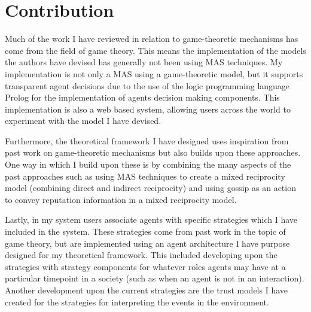 \documentclass[]{final_report}
\begin{document}
\section{Contribution}
Much of the work I have reviewed in relation to game-theoretic mechanisms has come from the field of game theory. This means the implementation of the models the authors have devised has generally not been using MAS techniques. My implementation is not only a MAS using a game-theoretic model, but it supports transparent agent decisions due to the use of the logic programming language Prolog for the implementation of agents decision making components. This implementation is also a web based system, allowing users across the world to experiment with the model I have devised.\par
Furthermore, the theoretical framework I have designed uses inspiration from past work on game-theoretic mechanisms but also builds upon these approaches. One way in which I build upon these is by combining the many aspects of the past approaches such as using MAS techniques to create a mixed reciprocity model (combining direct and indirect reciprocity) and using gossip as an action to convey reputation information in a mixed reciprocity model.\par
Lastly, in my system users associate agents with specific strategies which I have included in the system. These strategies come from past work in the topic of game theory, but are implemented using an agent architecture I have purpose designed for my theoretical framework. This included developing upon the strategies with strategy components for whatever roles agents may have at a particular timepoint in a society (such as when an agent is not in an interaction). Another development upon the current strategies are the trust models I have created for the strategies for interpreting the events in the environment.
\end{document}

